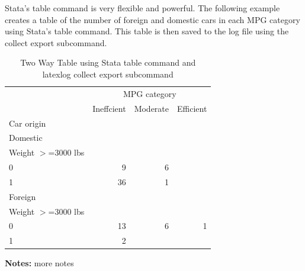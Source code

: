 \documentclass{article}
\begin{document}
\vspace{10pt}
Stata's table command is very flexible and powerful. 
The following example creates a table of the number of foreign and domestic cars 
in each MPG category using Stata's table command. 
This table is then saved to the log file using the collect export subcommand.
\begin{table}[htbp] 
\centering 
\begin{threeparttable} 
\caption{Two Way Table using Stata table command and latexlog collect export subcommand} 

\centering
\begin{tabular}{llll}
\toprule
\multicolumn{1}{c}{} &
  \multicolumn{3}{c}{MPG category} \\
\multicolumn{1}{c}{} &
  \multicolumn{1}{r}{Ineffcient} &
  \multicolumn{1}{r}{Moderate} &
  \multicolumn{1}{r}{Efficient} \\
\midrule
\multicolumn{1}{l}{Car origin} &
  \multicolumn{1}{r}{} &
  \multicolumn{1}{r}{} &
  \multicolumn{1}{r}{} \\
\multicolumn{1}{l}{\hspace{1em}Domestic} &
  \multicolumn{1}{r}{} &
  \multicolumn{1}{r}{} &
  \multicolumn{1}{r}{} \\
\multicolumn{1}{l}{\hspace{2em}Weight $>$=3000 lbs} &
  \multicolumn{1}{r}{} &
  \multicolumn{1}{r}{} &
  \multicolumn{1}{r}{} \\
\multicolumn{1}{l}{\hspace{3em}0} &
  \multicolumn{1}{r}{9} &
  \multicolumn{1}{r}{6} &
  \multicolumn{1}{r}{} \\
\multicolumn{1}{l}{\hspace{3em}1} &
  \multicolumn{1}{r}{36} &
  \multicolumn{1}{r}{1} &
  \multicolumn{1}{r}{} \\
\multicolumn{1}{l}{\hspace{1em}Foreign} &
  \multicolumn{1}{r}{} &
  \multicolumn{1}{r}{} &
  \multicolumn{1}{r}{} \\
\multicolumn{1}{l}{\hspace{2em}Weight $>$=3000 lbs} &
  \multicolumn{1}{r}{} &
  \multicolumn{1}{r}{} &
  \multicolumn{1}{r}{} \\
\multicolumn{1}{l}{\hspace{3em}0} &
  \multicolumn{1}{r}{13} &
  \multicolumn{1}{r}{6} &
  \multicolumn{1}{r}{1} \\
\multicolumn{1}{l}{\hspace{3em}1} &
  \multicolumn{1}{r}{2} &
  \multicolumn{1}{r}{} &
  \multicolumn{1}{r}{} \\
\bottomrule
\end{tabular}

\textbf{Notes:} more notes 
\end{threeparttable} 
\end{table}
\end{document}
